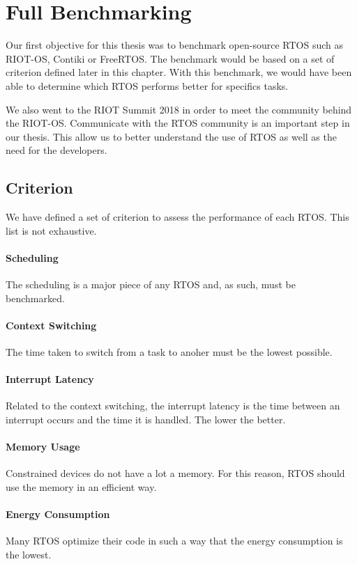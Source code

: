 \section{Full Benchmarking}

Our first objective for this thesis was to benchmark open-source RTOS such as RIOT-OS, Contiki or FreeRTOS.
The benchmark would be based on a set of criterion defined later in this chapter.
With this benchmark, we would have been able to determine which RTOS performs better for specifics tasks.

We also went to the RIOT Summit 2018 in order to meet the community behind the RIOT-OS.
Communicate with the RTOS community is an important step in our thesis.
This allow us to better understand the use of RTOS as well as the need for the developers.

\subsection{Criterion}
We have defined a set of criterion to assess the performance of each RTOS.
This list is not exhaustive.

\paragraph{Scheduling}
The scheduling is a major piece of any RTOS and, as such, must be benchmarked.

\paragraph{Context Switching}
The time taken to switch from a task to anoher must be the lowest possible.

\paragraph{Interrupt Latency}
Related to the context switching, the interrupt latency is the time between an interrupt occurs and the time it is handled.
The lower the better.

\paragraph{Memory Usage}
Constrained devices do not have a lot a memory.
For this reason, RTOS should use the memory in an efficient way.

\paragraph{Energy Consumption}
Many RTOS optimize their code in such a way that the energy consumption is the lowest.

